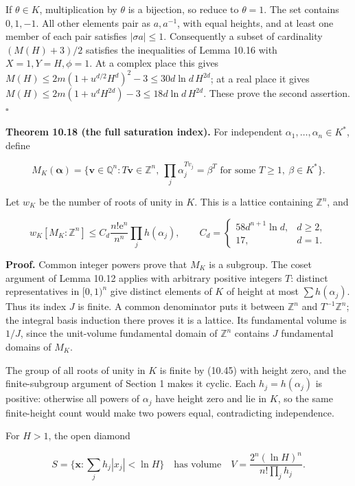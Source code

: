 \documentclass[
  11pt,
  a4paper,
]{article}
\begin{document}
If \(\theta\in K\), multiplication by \(\theta\) is a bijection, so
reduce to \(\theta=1\). The set contains \(0,1,-1\). All other elements
pair as \(a,a^{-1}\), with equal heights, and at least one member of
each pair satisfies \(|\sigma a|\le1\). Consequently a subset of
cardinality \((M(H)+3)/2\) satisfies the inequalities of Lemma 10.16
with \(X=1,Y=H,\phi=1\). At a complex place this gives
\(M(H)\le2m(1+u^{d/2}H^d)^2-3\le30d\ln d\,H^{2d}\); at a real place it
gives \(M(H)\le2m(1+u^dH^{2d})-3\le18d\ln d\,H^{2d}\). These prove the
second assertion. \(\square\)

\textbf{Theorem 10.18 (the full saturation index).} For independent
\(\alpha_1,\ldots,\alpha_n\in K^*\), define

\[
M_K(\boldsymbol\alpha)=
\{\boldsymbol v\in\mathbb Q^n:
T\boldsymbol v\in\mathbb Z^n,
\ \prod_j\alpha_j^{Tv_j}=\beta^T
\text{ for some }T\ge1,\ \beta\in K^*\}.
\tag{10.54}
\]

Let \(w_K\) be the number of roots of unity in \(K\). This is a lattice
containing \(\mathbb Z^n\), and

\[
w_K[M_K:\mathbb Z^n]
\le C_d\frac{n!\mathrm e^n}{n^n}\prod_jh(\alpha_j),
\qquad
C_d=\begin{cases}58d^{n+1}\ln d,&d\ge2,\\17,&d=1.
\end{cases}
\tag{10.55}
\]

\textbf{Proof.} Common integer powers prove that \(M_K\) is a subgroup.
The coset argument of Lemma 10.12 applies with arbitrary positive
integers \(T\): distinct representatives in \([0,1)^n\) give distinct
elements of \(K\) of height at most \(\sum h(\alpha_j)\). Thus its index
\(J\) is finite. A common denominator puts it between \(\mathbb Z^n\)
and \(T^{-1}\mathbb Z^n\); the integral basis induction there proves it
is a lattice. Its fundamental volume is \(1/J\), since the unit-volume
fundamental domain of \(\mathbb Z^n\) contains \(J\) fundamental domains
of \(M_K\).

The group of all roots of unity in \(K\) is finite by (10.45) with
height zero, and the finite-subgroup argument of Section 1 makes it
cyclic. Each \(h_j=h(\alpha_j)\) is positive: otherwise all powers of
\(\alpha_j\) have height zero and lie in \(K\), so the same
finite-height count would make two powers equal, contradicting
independence.

For \(H>1\), the open diamond

\[
S=\{\boldsymbol x:\sum_jh_j|x_j|<\ln H\}
\quad\text{has volume}\quad
V=\frac{2^n(\ln H)^n}{n!\prod_jh_j}.
\tag{10.56}
\]
\end{document}
